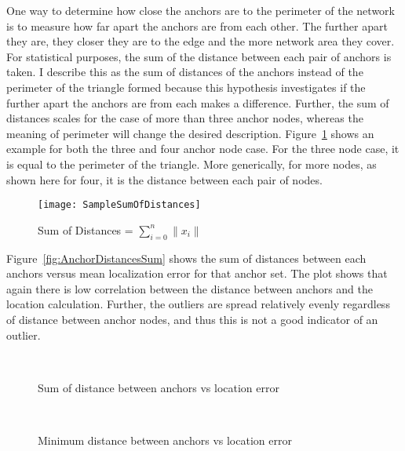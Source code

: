 One way to determine how close the anchors are to the perimeter of the network is to measure how far apart the anchors are from each other.  The further apart they are, they closer they are to the edge and the more network area they cover.  For statistical purposes, the sum of the distance between each pair of anchors is taken.  I describe this as the sum of distances of the anchors instead of the perimeter of the triangle formed because this hypothesis investigates if the further apart the anchors are from each makes a difference. Further, the sum of distances scales for the case of more than three anchor nodes, whereas the meaning of perimeter will change the desired description.  Figure~\ref{fig:SampleSumOfDistances} shows an example for both the three and four anchor node case.  For the three node case, it is equal to the perimeter of the triangle.  More generically, for more nodes, as shown here for four, it is the distance between each pair of nodes.

\begin{figure}
  \centering
    \texttt{[image: SampleSumOfDistances]}
    \caption{Sum of Distances = $\sum_{i=0}^{n} \|x_{i}\| $}
	\label{fig:SampleSumOfDistances}
\end{figure}

Figure~\ref{fig:AnchorDistancesSum} shows the sum of distances between each anchors versus mean localization error for that anchor set. The plot shows that again there is low correlation between the distance between anchors and the location calculation.  Further, the outliers are spread relatively evenly regardless of distance between anchor nodes, and thus this is not a good indicator of an outlier.

\begin{figure}
  \centering
\\
	\caption{Sum of distance between anchors vs location error}
    \label{fig:SumAnchorDistances}
\end{figure}
\begin{figure}
  \centering
\\
	\caption{Minimum distance between anchors vs location error}
    \label{fig:MinAnchorDistances}
\end{figure}

